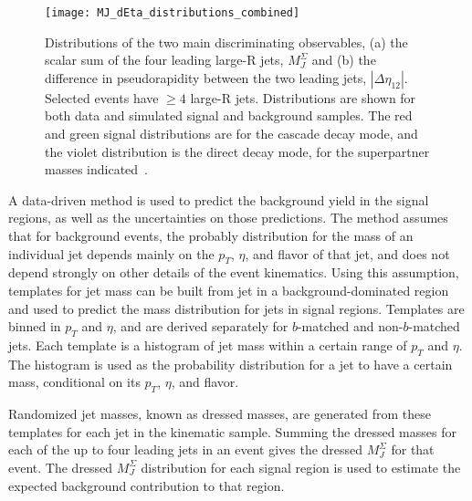 \begin{figure}[!ht]
    \centering
    \texttt{[image: MJ\_dEta\_distributions\_combined]}
    \caption{Distributions of the two main discriminating observables, (a) the scalar sum of the four leading large-R jets, $M_{J}^{\Sigma}$ and (b) the difference in pseudorapidity between the two leading jets, $|\Delta\eta_{12}|$.
    Selected events have $\geq 4$ large-R jets.
    Distributions are shown for both data and simulated signal and background samples.
    The red and green signal distributions are for the cascade decay mode, and the violet distribution is the direct decay mode, for the superpartner masses indicated~\cite{paper-plb}.}
    \label{fig:MJ_dEta_distributions}
\end{figure}

A data-driven method is used to predict the background yield in the signal regions, as well as the uncertainties on those predictions.
The method assumes that for background events, the probably distribution for the mass of an individual jet depends mainly on the $p_{T}$, $\eta$, and flavor of that jet, and does not depend strongly on other details of the event kinematics.
Using this assumption, templates for jet mass can be built from jet in a background-dominated region and used to predict the mass distribution for jets in signal regions.
Templates are binned in $p_{T}$ and $\eta$, and are derived separately for $b$-matched and non-$b$-matched jets.
Each template is a histogram of jet mass within a certain range of $p_{T}$ and $\eta$.
The histogram is used as the probability distribution for a jet to have a certain mass, conditional on its $p_{T}$, $\eta$, and flavor.

Randomized jet masses, known as dressed masses, are generated from these templates for each jet in the kinematic sample.
Summing the dressed masses for each of the up to four leading jets in an event gives the dressed $M_{J}^{\Sigma}$ for that event.
The dressed $M_{J}^{\Sigma}$ distribution for each signal region is used to estimate the expected background contribution to that region.

